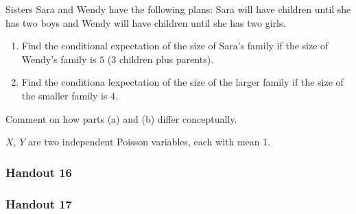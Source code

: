 \begin{problem}[Handout 15, \# 6]
  Sisters Sara and Wendy have the following plans: Sara will have children
  until she has two boys and Wendy will have children until she has two
  girls.
  \begin{enumerate}[label=(\alph*),noitemsep]
  \item Find the conditional expectation of the size of Sara's family if
    the size of Wendy's family is \(5\) (\(3\) children plus parents).
  \item Find the conditiona lexpectation of the size of the larger family
    if the size of the smaller family is \(4\).
  \end{enumerate}
  Comment on how parts (a) and (b) differ conceptually.
\end{problem}
\begin{solution*}
\end{solution*}

\begin{problem}[Handout 15, \# 7]
  \(X\), \(Y\) are two independent Poisson variables, each with mean \(1\).
\end{problem}
\begin{solution*}
\end{solution*}

\subsubsection{Handout 16}
\begin{problem}[Handout 16, \# ]
\end{problem}
\begin{solution*}
\end{solution*}

\begin{problem}
\end{problem}
\begin{solution*}
\end{solution*}

\begin{problem}
\end{problem}
\begin{solution*}
\end{solution*}

\subsubsection{Handout 17}
\begin{problem}
\end{problem}
\begin{solution*}
\end{solution*}

